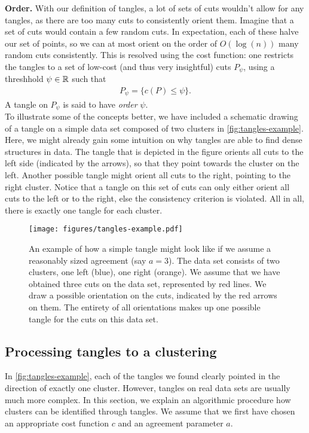 \noindent
\textbf{Order.} With our definition of tangles, a lot of sets of cuts wouldn't allow for any tangles, as there are too many cuts to consistently orient them. 
Imagine that a set of cuts would contain a few random cuts. 
In expectation, each of these halve our set of points, so we can at most orient on the order of $O(\log(n))$ many random cuts consistently.
This is resolved using the cost function: one restricts the tangles to a set of low-cost (and thus very insightful) cuts $P_{\psi}$, using a threshhold $\psi \in \mathbb{R}$ such that
\begin{align*}
P_{\psi} = \{ c(P) \le \psi \}   
.\end{align*}
A tangle on $P_{\psi}$ is said to have \textit{order} $\psi$. \\

\noindent
To illustrate some of the concepts better, we have included a schematic drawing of a tangle on 
a simple data set composed of two clusters in \autoref{fig:tangles-example}. 
Here, we might already gain some intuition on why tangles are able to find dense structures in data. 
The tangle that is depicted in the figure orients all cuts to the left side 
(indicated by the arrows), so that they point towards the cluster on the left. 
Another possible tangle might orient all cuts to the right, pointing to the right cluster. 
Notice that a tangle on this set of cuts can only either orient all cuts to the left or to the 
right, else the consistency criterion is violated. All in all, 
there is exactly one tangle for each cluster.

\begin{figure}[h]
    \centering
    \texttt{[image: figures/tangles-example.pdf]}
    \caption{An example of how a simple tangle might look like if we assume a reasonably sized agreement (say $a = 3$). 
        The data set consists of two clusters, one left (blue), one right (orange).
        We assume that we have obtained three cuts on the data set, represented 
        by red lines.
        We draw a possible orientation on the cuts, indicated by the red arrows on them. 
        The entirety of all orientations makes up one possible tangle for the cuts 
        on this data set. 
    }
    \label{fig:tangles-example}
\end{figure}

\subsection{Processing tangles to a clustering}
In \autoref{fig:tangles-example}, each of the tangles we found clearly pointed in the direction 
of exactly one cluster. However, tangles on real data sets
are usually much more complex. In this section, we explain an algorithmic procedure how clusters 
can be identified through tangles. We assume that we first have chosen an appropriate
cost function $c$ and an agreement parameter $a$. 

